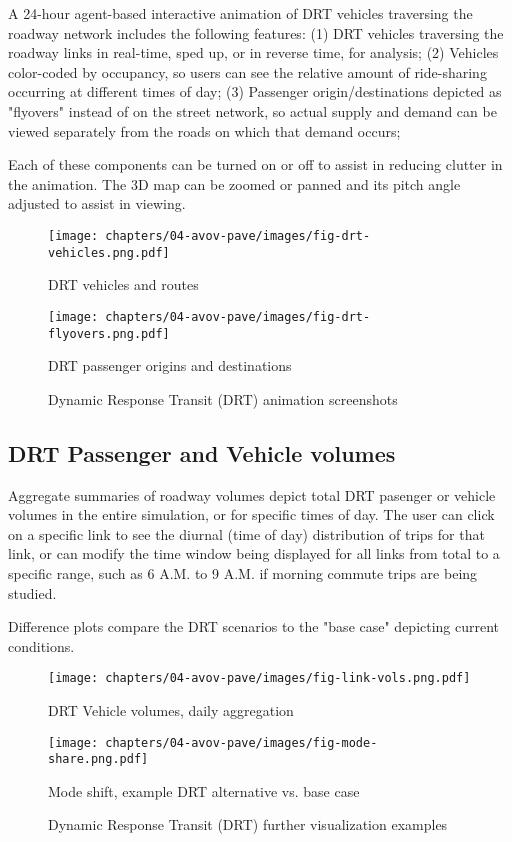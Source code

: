 A 24-hour agent-based interactive animation of DRT vehicles traversing the roadway network includes the following features: (1) DRT vehicles traversing the roadway links in real-time, sped up, or in reverse time, for analysis; (2) Vehicles color-coded by occupancy, so users can see the relative amount of ride-sharing occurring at different times of day; (3) Passenger origin/destinations depicted as "flyovers" instead of on the street network, so actual supply and demand can be viewed separately from the roads on which that demand occurs;

Each of these components can be turned on or off to assist in reducing clutter in the animation. The 3D map can be zoomed or panned and its pitch angle adjusted to assist in viewing.

\begin{figure}[ht]
\centering
\begin{minipage}[c]{0.4\textwidth}
   \texttt{[image: chapters/04-avov-pave/images/fig-drt-vehicles.png.pdf]}
   \caption{DRT vehicles and routes}
   \label{fig:vehicles}
\end{minipage}
\begin{minipage}[c]{0.4\textwidth}
   \texttt{[image: chapters/04-avov-pave/images/fig-drt-flyovers.png.pdf]}
   \caption{DRT passenger origins and destinations}
   \label{fig:flyover}
\end{minipage}
\caption{Dynamic Response Transit (DRT) animation screenshots}
\end{figure}

\subsection{DRT Passenger and Vehicle volumes}

Aggregate summaries of roadway volumes depict total DRT pasenger or vehicle volumes in the entire simulation, or for specific times of day. The user can click on a specific link to see the diurnal (time of day) distribution of trips for that link, or can modify the time window being displayed for all links from total to a specific range, such as 6 A.M. to 9 A.M. if morning commute trips are being studied.

Difference plots compare the DRT scenarios to the "base case" depicting current conditions.

\begin{figure}[ht]
  \centering
  \begin{minipage}[c]{0.32\textwidth}
     \texttt{[image: chapters/04-avov-pave/images/fig-link-vols.png.pdf]}
     \caption{DRT Vehicle volumes, daily aggregation }
     \label{fig:vehicles}
  \end{minipage}
  \begin{minipage}[c]{0.32\textwidth}
     \texttt{[image: chapters/04-avov-pave/images/fig-mode-share.png.pdf]}
     \caption{Mode shift, example DRT alternative vs. base case}
     \label{fig:flyover}
  \end{minipage}
  \caption{Dynamic Response Transit (DRT) further visualization examples}
\end{figure}


